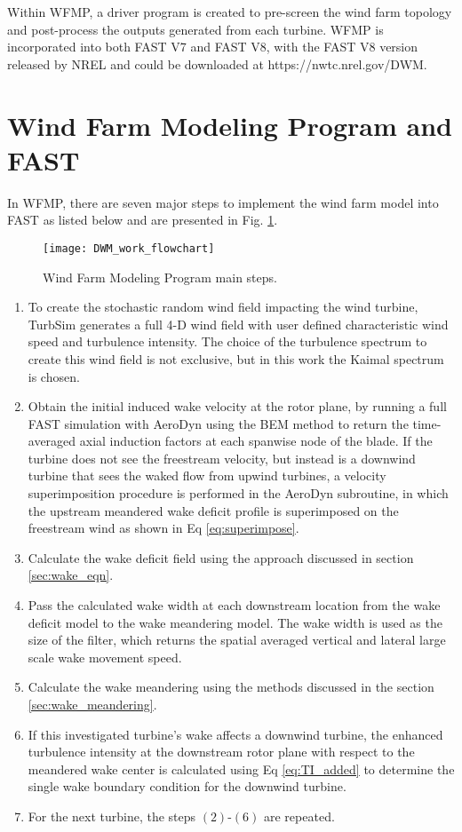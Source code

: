 \documentclass{umthesis}
\begin{document}
Within WFMP, a driver program is created to pre-screen the wind farm topology and post-process the outputs generated from each turbine. WFMP is incorporated into both FAST V7 and FAST V8, with the FAST V8 version released by NREL and could be downloaded at https://nwtc.nrel.gov/DWM.

\section{Wind Farm Modeling Program and FAST}
In WFMP, there are seven major steps to implement the wind farm model into FAST as listed below and are presented in Fig. \ref{fig:DWM_work_flowchart}.
\begin{figure}
  \centering
  \texttt{[image: DWM\_work\_flowchart]}
  \caption{Wind Farm Modeling Program main steps.}\label{fig:DWM_work_flowchart}
\end{figure}


\begin{enumerate}
  \item To create the stochastic random wind field impacting the wind turbine, TurbSim generates a full 4-D wind field with user defined characteristic wind speed and turbulence intensity. The choice of the turbulence spectrum to create this wind field is not exclusive, but in this work the Kaimal spectrum is chosen.
  \item Obtain the initial induced wake velocity at the rotor plane, by running a full FAST simulation with AeroDyn using the BEM method to return the time-averaged axial induction factors at each spanwise node of the blade. If the turbine does not see the freestream velocity, but instead is a downwind turbine that sees the waked flow from upwind turbines, a velocity superimposition procedure is performed in the AeroDyn subroutine, in which the upstream meandered wake deficit profile is superimposed on the freestream wind as shown in Eq \ref{eq:superimpose}.
  \item Calculate the wake deficit field using the approach discussed in section \ref{sec:wake_eqn}.
  \item Pass the calculated wake width at each downstream location from the wake deficit model to the wake meandering model. The wake width is used as the size of the filter, which returns the spatial averaged vertical and lateral large scale wake movement speed.
  \item Calculate the wake meandering using the methods discussed in the section \ref{sec:wake_meandering}.
  \item If this investigated turbine's wake affects a downwind turbine, the enhanced turbulence intensity at the downstream rotor plane with respect to the meandered wake center is calculated using Eq \ref{eq:TI_added} to determine the single wake boundary condition for the downwind turbine.
  \item For the next turbine, the steps $(2)$-$(6)$ are repeated.
\end{enumerate}
\end{document}
